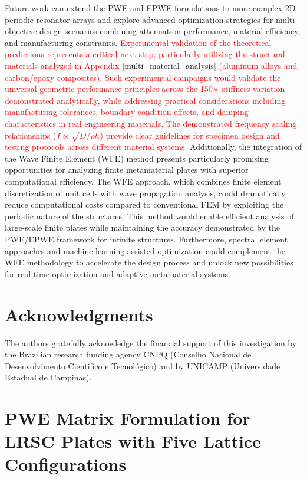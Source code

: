 \documentclass[review,numbers,sort&compress]{elsarticle}
\begin{document}
{Future work can extend the PWE and EPWE formulations to more complex 2D periodic resonator arrays and explore advanced optimization strategies for multi-objective design scenarios combining attenuation performance, material efficiency, and manufacturing constraints. \textcolor{red}{Experimental validation of the theoretical predictions represents a critical next step, particularly utilizing the structural materials analyzed in Appendix \ref{multi_material_analysis} (aluminum alloys and carbon/epoxy composites). Such experimental campaigns would validate the universal geometric performance principles across the 150× stiffness variation demonstrated analytically, while addressing practical considerations including manufacturing tolerances, boundary condition effects, and damping characteristics in real engineering materials. The demonstrated frequency scaling relationships ($f \propto \sqrt{D/\rho h}$) provide clear guidelines for specimen design and testing protocols across different material systems.} Additionally, the integration of the Wave Finite Element (WFE) method presents particularly promising opportunities for analyzing finite metamaterial plates with superior computational efficiency. The WFE approach, which combines finite element discretization of unit cells with wave propagation analysis, could dramatically reduce computational costs compared to conventional FEM by exploiting the periodic nature of the structures. This method would enable efficient analysis of large-scale finite plates while maintaining the accuracy demonstrated by the PWE/EPWE framework for infinite structures. Furthermore, spectral element approaches and machine learning-assisted optimization could complement the WFE methodology to accelerate the design process and unlock new possibilities for real-time optimization and adaptive metamaterial systems.


\newpage
\section*{Acknowledgments}
The authors gratefully acknowledge the financial support of this investigation by the Brazilian research funding agency CNPQ (Conselho Nacional de Desenvolvimento Cientifico e Tecnológico) and by UNICAMP (Universidade Estadual de Campinas).

\newpage
\appendix
\section{PWE Matrix Formulation for LRSC Plates with Five Lattice Configurations}\label{AppenA_supplement_results1}

}
\end{document}
